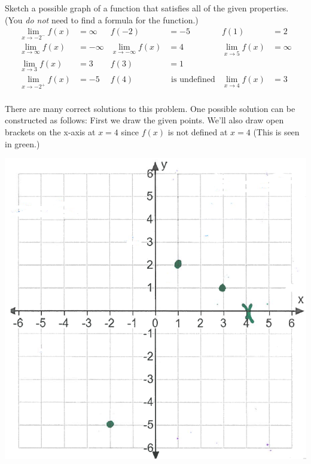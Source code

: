 \documentclass[nooutcomes,handout]{ximera}
\begin{document}
\begin{problem}
 Sketch a possible graph of a function that satisfies all of the given properties.
  (You \emph{do not} need to find a formula for the function.)
  \begin{align*}
 	\lim_{x \to -2^-} f(x) &= \infty &   f(-2) &= -5 &  f(1) &= 2 \\
	 \lim_{x \to \infty} f(x) &= -\infty & \lim_{x \to -\infty} f(x) &= 4 & \lim_{x \to 5} f(x) &= \infty \\
	 \lim_{x \to 3} f(x) &= 3 & f(3) &=  1 &\\
	  \lim_{x \to -2^+}f(x)&=-5  & f(4) &\text{ is undefined}& \lim_{x \to 4}f(x)&=3\\
  \end{align*}
  \begin{freeResponse}
      There are many correct solutions to this problem.
  One possible solution can be constructed as follows:
	First we draw the given points.  We'll also draw open brackets on the x-axis at $x=4$ since $f(x)$ is not defined at $x=4$ (This is seen in green.)
	\begin{image}
   	 \includegraphics[scale = 0.4]{Figure10.png}   
	\end{image} 


\end{freeResponse}
\end{problem}
\end{document}
